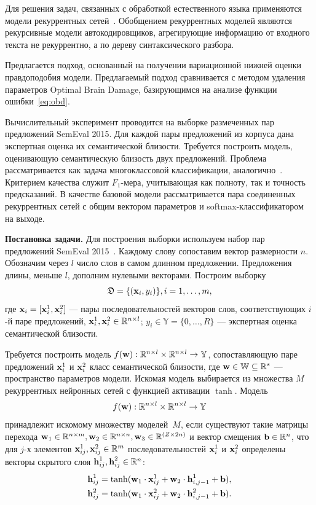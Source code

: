 Для решения задач, связанных с обработкой естественного языка применяются модели рекуррентных сетей~\cite{siamese}. Обобщением рекуррентных моделей являются рекурсивные модели автокодировщиков, агрегирующие информацию от  входного текста не рекуррентно, а по дереву синтаксического разбора.

Предлагается подход, основанный на получении вариационной нижней оценки правдоподобия модели. Предлагаемый подход сравнивается с методом удаления параметров Optimal Brain Damage, базирующимся на анализе функции ошибки~\eqref{eq:obd}. 

Вычислительный эксперимент проводится на выборке размеченных пар предложений SemEval 2015. Для каждой пары предложений из корпуса дана экспертная оценка их семантической близости. Требуется построить модель, оценивающую семантическую близость двух предложений. Проблема рассматривается как задача многоклассовой классификации, аналогично~\cite{sanborn}. Критерием качества служит $F_1$-мера, учитывающая как полноту, так и точность предсказаний.
В качестве базовой модели рассматривается пара соединенных рекуррентных сетей с общим вектором параметров и softmax-классификатором на выходе.

\textbf{Постановка задачи. }
Для построения выборки используем набор пар предложений SemEval 2015~\cite{semeval2015}.
Каждому слову сопоставим вектор размерности $n$.
Обозначим через $l$ число слов в самом длинном предложении. Предложения длины, меньше $l$, дополним нулевыми векторами. 
Построим выборку
$$ {\mathfrak{D}} = \{({\textbf{x}}_i,y_i)\}, i = 1,\dots,m,$$
где ${\textbf{x}}_i = [{\textbf{x}}_i^1,{\textbf{x}}_i^2]$ --- пары последовательностей векторов слов, соответствующих $i$-й паре предложений, ${\textbf{x}}_i^1, {\textbf{x}}_i^2 \in \mathbb{R}^{n\times l}$;
$y_i \in \mathbb{Y} = \{0,\dots,R\}$ --- экспертная оценка семантической близости. 

Требуется построить модель $f({\textbf{w}}): \mathbb{R}^{n\times l} \times \mathbb{R}^{n\times l} \to \mathbb{Y}$, сопоставляющую паре предложений ${\textbf{x}}_i^1$ и ${\textbf{x}}_i^2$ класс семантической близости, где ${\textbf{w}} \in {\mathbb{W}}\subseteq\mathbb{R}^s$ --- пространство параметров модели.
Искомая модель выбирается из множества $M$ рекуррентных нейронных сетей с функцией активации $\tanh$. Модель 
\[
f({\textbf{w}}): \mathbb{R}^{n\times l} \times \mathbb{R}^{n\times l} \to \mathbb{Y}
\]
принадлежит искомому множеству моделей~$M$, если существуют такие матрицы перехода $\mathbf{w}_1\in \mathbb{R}^{n\times m}, \mathbf{w}_2\in \mathbb{R}^{n\times n}, \mathbf{w}_3\in \mathbb{R}^{(Z \times 2n)}$ и вектор смещения ${\mathbf{b}} \in \mathbb{R}^{n}$, что для $j$-х элементов ${\textbf{x}}_{ij}^1, {\textbf{x}}_{ij}^2 \in \mathbb{R}^m$ последовательностей ${\textbf{x}}_i^1$ и ${\textbf{x}}_i^2$ определены векторы скрытого слоя ${\textbf{h}}_{ij}^1, {\textbf{h}}_{ij}^2 \in \mathbb{R}^{n}$:
\begin{gather}
{\textbf{h}}_{ij}^1 = \tanh(\mathbf{w}_1\cdot {\textbf{x}}_{ij}^1 + \mathbf{w}_2\cdot {\textbf{h}}_{i,j-1}^1 + {\mathbf{b}}),\\
{\textbf{h}}_{ij}^2 = \tanh(\mathbf{w}_1\cdot {\textbf{x}}_{ij}^2 + \mathbf{w}_2\cdot {\textbf{h}}_{i,j-1}^2 + {\mathbf{b}}).
\end{gather}

